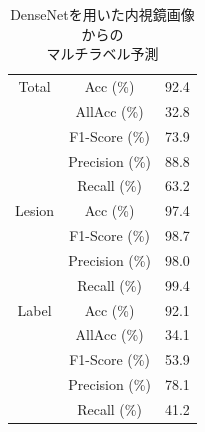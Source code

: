 \begin{table}[tb]
    \caption[]{DenseNetを用いた内視鏡画像からの\\マルチラベル予測}
    \label{tb:densenet121_e}
    \centering
    \normalsize
    \begin{tabular}{c|c|r} \hline
        Total & Acc (\%) & 92.4 \\ \cline{2-3}
         & AllAcc (\%) & 32.8 \\ \cline{2-3}
         & F1-Score (\%) & 73.9 \\ \cline{2-3}
         & Precision (\%) & 88.8 \\ \cline{2-3}
         & Recall (\%) & 63.2 \\ \hline
        Lesion & Acc (\%) & 97.4 \\ \cline{2-3}
         & F1-Score (\%) & 98.7 \\ \cline{2-3}
         & Precision (\%) & 98.0 \\ \cline{2-3}
         & Recall (\%) & 99.4 \\ \hline
        Label & Acc (\%) & 92.1 \\ \cline{2-3}
         & AllAcc (\%) & 34.1 \\ \cline{2-3}
         & F1-Score (\%) & 53.9 \\ \cline{2-3}
         & Precision (\%) & 78.1 \\ \cline{2-3}
         & Recall (\%) & 41.2 \\ \hline
    \end{tabular}
\end{table}

